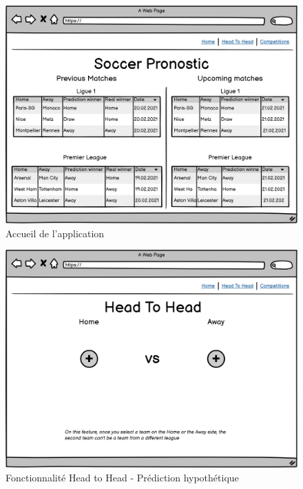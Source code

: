 \documentclass[a4paper,14pt]{extarticle}
\begin{document}
{\begin{figure}[H]
    \centering
    \includegraphics[width=13cm]{../img/maquetteAccueil.png}
    \caption{Accueil de l'application}
    \label{fig:accueil}
\end{figure}

\begin{figure}[H]
    \centering
    \includegraphics[width=13cm]{../img/maquetteH2H_1.png}
    \caption{Fonctionnalité Head to Head - Prédiction hypothétique}
    \label{fig:maquetteH2H_1}
\end{figure}

}
\end{document}
